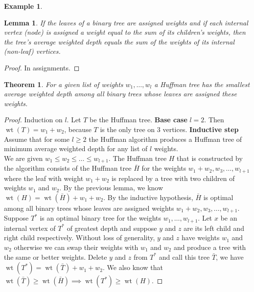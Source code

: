 \documentclass{article}
\newtheorem*{thm}{Theorem}
\newtheorem*{lem}{Lemma}
\theoremstyle{definition}
\newtheorem*{ex}{Example}
\DeclareMathOperator{\wt}{wt}
\begin{document}
\begin{ex}
\end{ex}

\begin{lem}
If the leaves of a binary tree are assigned weights and if each internal vertex (node) is assigned a weight equal to the sum of its children's weights, then the tree's average weighted depth equals the sum of the weights of its internal (non-leaf) vertices.
\end{lem}

\begin{proof}
In assignments.
\end{proof}

\begin{thm}
For a given list of weights $w_1,\ldots,w_l$ a Huffman tree has the smallest average weighted depth among all binary trees whose leaves are assigned these weights.
\end{thm}

\begin{proof}
Induction on $l$.
Let $T$ be the Huffman tree.
\textbf{Base case} $l=2$. Then $\wt(T) = w_1 + w_2$, because $T$ is the only tree on 3 vertices.
\textbf{Inductive step} Assume that for some $l\ge 2$ the Huffman algorithm produces a Huffman tree of minimum average weighted depth for any list of $l$ weights. \\
We are given $w_1\le w_2\le \ldots\le w_{l+1}$. The Huffman tree $H$ that is constructed by the algorithm consists of the Huffman tree $\bar{H}$ for the weights $w_1+w_2,w_3,\ldots,w_{l+1}$ where the leaf with weight $w_1+w_2$ is replaced by a tree with two children of weights $w_1$ and $w_2$.
By the previous lemma, we know $\wt(H) = \wt(\bar{H}) + w_1 + w_2$.
By the inductive hypothesis, $\bar{H}$ is optimal among all binary trees whose leaves are assigned weights  $w_1+w_2,w_3,\ldots,w_{l+1}$. \\
Suppose $T^*$ is an optimal binary tree for the weights $w_1,\ldots,w_{l+1}$.
Let $x$ be an internal vertex of $T^*$ of greatest depth and suppose $y$ and $z$ are its left child and right child respectively. Without loss of generality, $y$ and $z$ have weights $w_1$ and $w_2$ otherwise we can swap their weights with $w_1$ and $w_2$ and produce a tree with the same or better weights.
Delete $y$ and $z$ from $T^*$ and call this tree $\bar{T}$, we have $\wt(T^*) = \wt(\bar{T}) + w_1 + w_2$. We also know that $\wt(\bar{T}) \ge \wt(\bar{H})\implies \wt(T^*)\ge \wt(H)$.
\end{proof}
\end{document}
